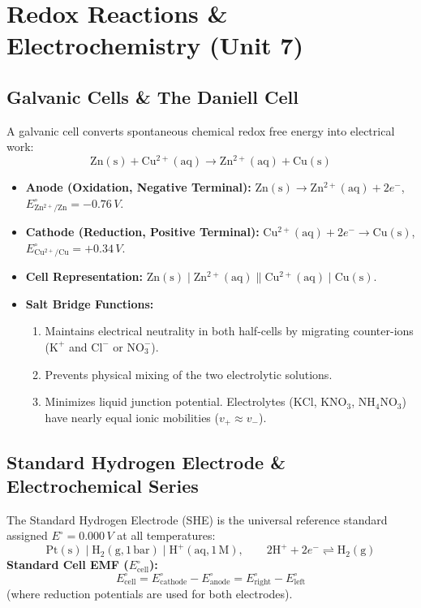\documentclass[10pt,twoside,openright]{book}
\begin{document}
\section{Redox Reactions \& Electrochemistry (Unit 7)}

\subsection{Galvanic Cells \& The Daniell Cell}
A galvanic cell converts spontaneous chemical redox free energy into electrical work:
\begin{equation}
  \mathrm{Zn(s)} + \mathrm{Cu^{2+}(aq)} \longrightarrow \mathrm{Zn^{2+}(aq)} + \mathrm{Cu(s)}
\end{equation}
\begin{itemize}
  \item \textbf{Anode (Oxidation, Negative Terminal):} $\mathrm{Zn(s)} \to \mathrm{Zn^{2+}(aq)} + 2e^-$, $E^\circ_{\mathrm{Zn^{2+}/Zn}} = -0.76\,\si{V}$.
  \item \textbf{Cathode (Reduction, Positive Terminal):} $\mathrm{Cu^{2+}(aq)} + 2e^- \to \mathrm{Cu(s)}$, $E^\circ_{\mathrm{Cu^{2+}/Cu}} = +0.34\,\si{V}$.
  \item \textbf{Cell Representation:} $\mathrm{Zn(s)} \mid \mathrm{Zn^{2+}(aq)} \parallel \mathrm{Cu^{2+}(aq)} \mid \mathrm{Cu(s)}$.
  \item \textbf{Salt Bridge Functions:}
  \begin{enumerate}
    \item Maintains electrical neutrality in both half-cells by migrating counter-ions ($\mathrm{K}^+$ and $\mathrm{Cl}^-$ or $\mathrm{NO_3^-}$).
    \item Prevents physical mixing of the two electrolytic solutions.
    \item Minimizes liquid junction potential. Electrolytes ($\mathrm{KCl}$, $\mathrm{KNO_3}$, $\mathrm{NH_4NO_3}$) have nearly equal ionic mobilities ($v_+ \approx v_-$).
  \end{enumerate}
\end{itemize}

\subsection{Standard Hydrogen Electrode \& Electrochemical Series}
The Standard Hydrogen Electrode (SHE) is the universal reference standard assigned $E^\circ = 0.000\,\si{V}$ at all temperatures:
\begin{equation}
  \mathrm{Pt(s)} \mid \mathrm{H_2(g, 1\,bar)} \mid \mathrm{H^+(aq, 1\,M)}, \qquad 2\mathrm{H^+} + 2e^- \rightleftharpoons \mathrm{H_2(g)}
\end{equation}
\textbf{Standard Cell EMF ($E_{\text{cell}}^\circ$):}
\begin{equation}
  E_{\text{cell}}^\circ = E_{\text{cathode}}^\circ - E_{\text{anode}}^\circ = E_{\text{right}}^\circ - E_{\text{left}}^\circ
\end{equation}
(where reduction potentials are used for both electrodes).
\end{document}
